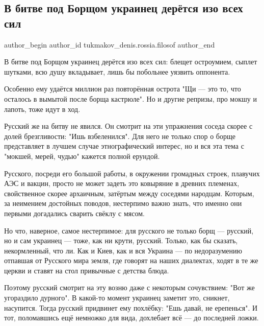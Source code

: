  
 
 
 
 
 
\subsection{В битве под Борщом украинец дерётся изо всех сил}
\label{sec:07_12_2020.fb.tukmakov_denis.rossia.filosof.1.bitva_borsch}
 
\ifcmt
 author_begin
   author_id tukmakov_denis.rossia.filosof
 author_end
\fi

В битве под Борщом украинец дерётся изо всех сил: блещет остроумием, сыплет
шутками, всю душу вкладывает, лишь бы побольнее уязвить оппонента.

Особенно ему удаётся миллион раз повторённая острота "Щи — это то, что осталось
в вымытой после борща кастрюле". Но и другие репризы, про мокшу и лапоть, тоже
идут в ход.

Русский же на битву не явился. Он смотрит на эти упражнения соседа скорее с
долей брезгливости: "Ишь взбеленился". Для него не только спор о борще
представляет в лучшем случае этнографический интерес, но и вся эта тема с
"мокшей, мерей, чудью" кажется полной ерундой. 

Русского, посреди его большой работы, в окружении громадных строек, плавучих
АЭС и вакцин, просто не может задеть это ковыряние в древних племенах,
свойственное скорее архаичным, затёртым между соседями народцам. Которым, за
неимением достойных поводов, нестерпимо важно знать, что именно они первыми
догадались сварить свёклу с мясом.

Но что, наверное, самое нестерпимое: для русского не только борщ — русский, но
и сам украинец — тоже, как ни крути, русский. Только, как бы сказать,
некормленный, что ли. Как и Киев, как и вся Украина — по недоразумению отпавшая
от Русского мира земля, где говорят на наших диалектах, ходят в те же церкви и
ставят на стол привычные с детства блюда.

Поэтому русский смотрит на эту возню даже с некоторым сочувствием: "Вот же
угораздило дурного". В какой-то момент украинец заметит это, сникнет,
насупится. Тогда русский придвинет ему похлёбку: "Ешь давай, не ерепенься". И
тот, поломавшись ещё немножко для вида, дохлебает всё — до последней ложки.

